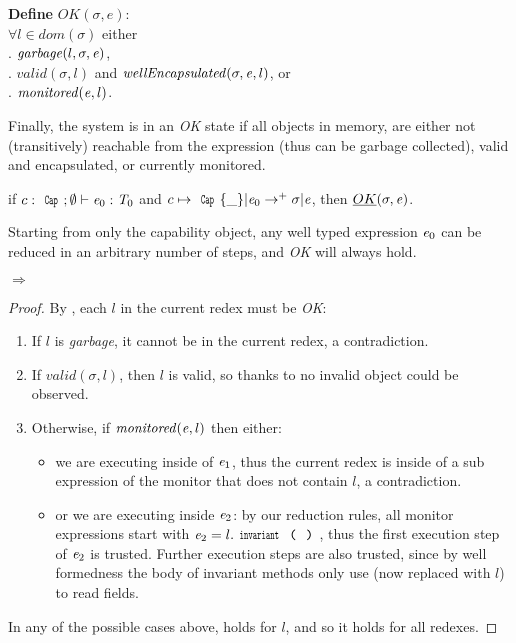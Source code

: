 \noindent\textbf{Define} $\mathit{OK}(\sigma,e)$:\\
\indent $\forall l\in\textit{dom}(\sigma)$
  either\\
\indent{}. $\mathit{garbage}(l,\sigma,{\mathit{e}})$,\\
\indent{}. $\mathit{valid}(\sigma,l)$ and $\mathit{wellEncapsulated}(\sigma,{\mathit{e}},l)$, or\\
\indent{}. $\mathit{monitored}({\mathit{e}},l)$.

Finally, the system is in an \emph{OK} state
if all objects in memory, are either
not (transitively) reachable from the expression (thus can be garbage collected),
valid and encapsulated,
or currently monitored.

\begin{theorem}\rm
if $c:\Kw{Cap};\emptyset\vdash \e_0: \T_0$ and
$c\mapsto\Kw{Cap}\{\_\}|\e_0\rightarrow^+ \sigma|\e$, then
$\emph{OK}(\sigma,{\mathit{e}})$.
\end{theorem}
\noindent Starting from only the capability object,
any well typed expression ${\mathit{e}}_0$ can be reduced in an arbitrary number of steps,
and \emph{OK} will always hold.

\begin{theorem}\rm {} $\Rightarrow$ 
\end{theorem}
\begin{proof}
\noindent By , each $l$ in the current redex must be \emph{OK}:
\begin{enumerate}
	\item If $l$ is \emph{garbage}, it cannot be in the current redex, a contradiction.
	\item If $\mathit{valid}(\sigma,l)$, then $l$ is valid, so thanks to 
	no invalid object could be observed.
	\item Otherwise, if $\mathit{monitored}({\mathit{e}},l)$ then either:
	\begin{itemize}
	 \item we are executing inside of ${\mathit{e}}_1$, thus the current redex is inside of a sub expression of the monitor that does not contain $l$, a contradiction.
	 \item or we are executing inside ${\mathit{e}}_2$:
	 by our reduction rules, all monitor expressions start with
	 $\e_2=l.\invariant$, thus the first execution step
	 of ${\mathit{e}}_2$ is trusted. Further execution steps are also trusted, since by well formedness the body of invariant methods only use \Q@this@ (now replaced with $l$) to read fields.
	\end{itemize}
\end{enumerate}
In any of the possible cases above,  holds for $l$, and so it holds for all redexes.
\end{proof}

